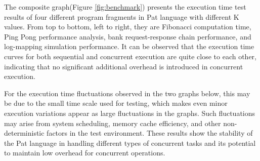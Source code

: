 \documentclass{l4proj}
\begin{document}
\begin{table}[ht]
\centering
\renewcommand{\arraystretch}{1.1}
\caption{Part List of Savina Benchmarks. \colorbox{yellow}{referenceHere}}
\label{Savina}
\end{table}

The composite graph(Figure \ref{fig:benchmark}) presents the execution time test results of four different program fragments in Pat language with different K values. From top to bottom, left to right, they are Fibonacci computation time, Ping Pong performance analysis, bank request-response chain performance, and log-mapping simulation performance. It can be observed that the execution time curves for both sequential and concurrent execution are quite close to each other, indicating that no significant additional overhead is introduced in concurrent execution.

For the execution time fluctuations observed in the two graphs below, this may be due to the small time scale used for testing, which makes even minor execution variations appear as large fluctuations in the graphs. Such fluctuations may arise from system scheduling, memory cache efficiency, and other non-deterministic factors in the test environment. These results show the stability of the Pat language in handling different types of concurrent tasks and its potential to maintain low overhead for concurrent operations.
\end{document}
